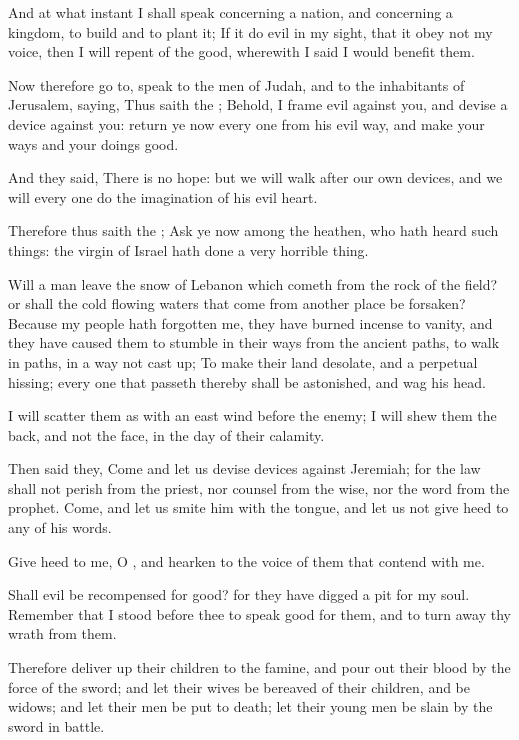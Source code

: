 \verse And at what instant I shall speak concerning a nation, and concerning a kingdom, to build and to plant it; \verse If it do evil in my sight, that it obey not my voice, then I will repent of the good, wherewith I said I would benefit them.

\verse Now therefore go to, speak to the men of Judah, and to the inhabitants of Jerusalem, saying, Thus saith the \LORD; Behold, I frame evil against you, and devise a device against you: return ye now every one from his evil way, and make your ways and your doings good.

\verse And they said, There is no hope: but we will walk after our own devices, and we will every one do the imagination of his evil heart.

\verse Therefore thus saith the \LORD; Ask ye now among the heathen, who hath heard such things: the virgin of Israel hath done a very horrible thing.

\verse Will a man leave the snow of Lebanon which cometh from the rock of the field? or shall the cold flowing waters that come from another place be forsaken?  \verse Because my people hath forgotten me, they have burned incense to vanity, and they have caused them to stumble in their ways from the ancient paths, to walk in paths, in a way not cast up; \verse To make their land desolate, and a perpetual hissing; every one that passeth thereby shall be astonished, and wag his head.

\verse I will scatter them as with an east wind before the enemy; I will shew them the back, and not the face, in the day of their calamity.

\verse Then said they, Come and let us devise devices against Jeremiah; for the law shall not perish from the priest, nor counsel from the wise, nor the word from the prophet. Come, and let us smite him with the tongue, and let us not give heed to any of his words.

\verse Give heed to me, O \LORD, and hearken to the voice of them that contend with me.

\verse Shall evil be recompensed for good? for they have digged a pit for my soul. Remember that I stood before thee to speak good for them, and to turn away thy wrath from them.

\verse Therefore deliver up their children to the famine, and pour out their blood by the force of the sword; and let their wives be bereaved of their children, and be widows; and let their men be put to death; let their young men be slain by the sword in battle.

